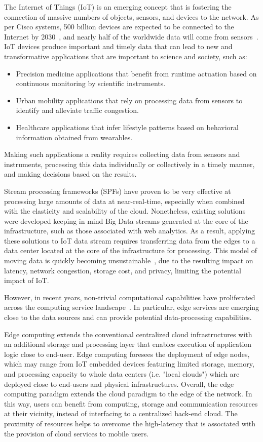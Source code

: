 The Internet of Things (IoT) is an emerging concept that is fostering the connection of massive numbers of objects, sensors, and devices to the network. As per Cisco systems, 500 billion devices are expected to be connected to the Internet by 2030~\cite{ciscoIoT}, and nearly half of the worldwide data will come from sensors~\cite{McAuley}. 
%
IoT devices produce important and timely data that can lead to new and transformative applications that are important to science and society, such as:
%
\begin{itemize} 
  \item Precision medicine applications that benefit from runtime actuation based on continuous monitoring by scientific instruments.
  \item Urban mobility applications that rely on processing data from sensors to identify and alleviate traffic congestion. 
  \item Healthcare applications that infer lifestyle patterns based on behavioral information obtained from wearables. 
\end{itemize} 

Making such applications a reality requires collecting data from sensors and instruments, processing this data individually or collectively in a timely manner, and making decisions based on the results. 

Stream processing frameworks (SPFs) have proven to be very effective at processing large amounts of data at near-real-time, especially when combined with the elasticity and scalability of the cloud. Nonetheless, existing solutions were developed keeping in mind Big Data streams generated at the core of the infrastructure, such as those associated with web analytics. As a result, applying these solutions to IoT data stream requires transferring data from the edges to a data center located at the core of the infrastructure for processing. This model of moving data is quickly becoming unsustainable~\cite{intro}, due to the resulting impact on latency, network congestion, storage cost, and privacy, limiting the potential impact of IoT.

However, in recent years, non-trivial computational capabilities have proliferated across the computing service landscape~\cite{continuum}. In particular, edge services are emerging close to the data sources and can provide potential data-processing capabilities\cite{dastjerdi2016fog,bonomi2014fog}. 

Edge computing extends the conventional centralized cloud infrastructures with an additional storage and processing layer that enables execution of application logic close to end-user. Edge computing foresees the deployment of edge nodes, which may range from IoT embedded devices featuring limited storage, memory, and processing capacity to whole data centers (i.e. "local clouds") which are deployed close to end-users and physical infrastructures. Overall, the edge computing paradigm extends the cloud paradigm to the edge of the network. In this way, users can benefit from computing, storage and communication resources at their vicinity, instead of interfacing to a centralized back-end cloud. The proximity of resources helps to overcome the high-latency that is associated with the provision of cloud services to mobile users.

